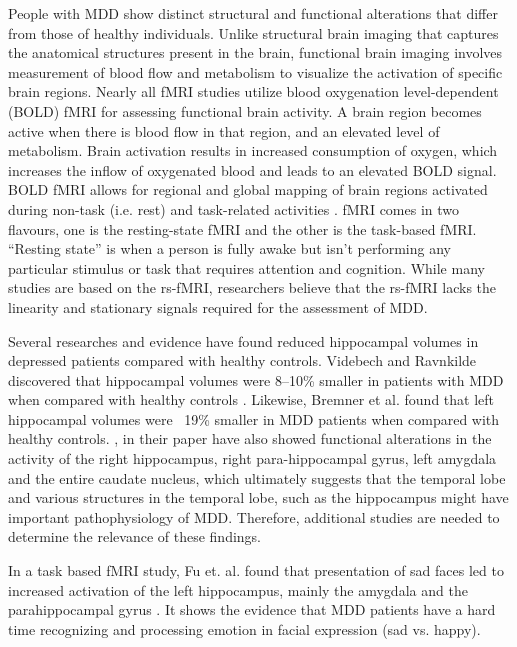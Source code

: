 \documentclass[12pt]{article}
\begin{document}
People with MDD show distinct structural and functional alterations
that differ from those of healthy individuals. Unlike structural brain
imaging that captures the anatomical structures present in the brain,
functional brain imaging involves measurement of blood flow and
metabolism to visualize the activation of specific brain
regions. Nearly all fMRI studies utilize blood oxygenation
level-dependent (BOLD) fMRI for assessing functional brain
activity. A brain region becomes active when there is blood flow in
that region, and an elevated level of metabolism. Brain activation
results in increased consumption of oxygen, which increases the inflow
of oxygenated blood and leads to an elevated BOLD signal. BOLD fMRI
allows for regional and global mapping of brain regions activated
during non-task (i.e. rest) and task-related activities
\cite{zhuo2019rise}. fMRI comes in two flavours, one is the
resting-state fMRI and the other is the task-based fMRI. ``Resting
state'' is when a person is fully awake but isn’t performing any
particular stimulus or task that requires attention and
cognition. While many studies are based on the rs-fMRI, researchers
believe that the rs-fMRI lacks the linearity and stationary signals
required for the assessment of MDD.

\newpage
Several researches and evidence have found reduced hippocampal volumes
in depressed patients compared with healthy controls. Videbech and
Ravnkilde discovered that hippocampal volumes were 8–10\% smaller in
patients with MDD when compared with healthy controls
\cite{zhuo2019rise}. Likewise, Bremner et al. found that left
hippocampal volumes were ~19\% smaller in MDD patients when compared
with healthy controls\cite{zhuo2019rise}. \textcite{zhuo2019rise}, in
their paper have also showed functional alterations in the activity of
the right hippocampus, right para-hippocampal gyrus, left amygdala and
the entire caudate nucleus, which ultimately suggests that the
temporal lobe and various structures in the temporal lobe, such as the
hippocampus might have important pathophysiology of MDD. Therefore,
additional studies are needed to determine the relevance of these
findings.

In a task based fMRI study, Fu et. al. found that presentation of sad
faces led to increased activation of the left hippocampus, mainly the
amygdala and the parahippocampal gyrus \cite{correlation}. It shows
the evidence that MDD patients have a hard time recognizing and
processing emotion in facial expression (sad vs. happy).
\end{document}
